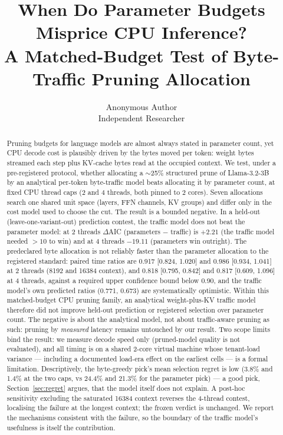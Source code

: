 \documentclass[11pt]{article}
\title{When Do Parameter Budgets Misprice CPU Inference?\\ A Matched-Budget Test of Byte-Traffic Pruning Allocation}
\author{Anonymous Author\\ Independent Researcher}
\date{}
\begin{document}
\maketitle

\begin{abstract}
Pruning budgets for language models are almost always stated in
parameter count, yet CPU decode cost is plausibly driven by the bytes
moved per token: weight bytes streamed each step plus KV-cache bytes
read at the occupied context. We test, under a pre-registered
protocol, whether allocating a $\sim$25\% structured prune of
Llama-3.2-3B by an analytical per-token byte-traffic model beats
allocating it by parameter count, at fixed CPU thread caps
(2 and 4 threads, both pinned to 2 cores). Seven
allocations search one shared unit space (layers, FFN channels, KV
groups) and differ only in the cost model used to choose the cut.
The result is a bounded negative. In a held-out
(leave-one-variant-out) prediction contest, the traffic model does
not beat the parameter model: at 2 threads $\Delta$AIC
(parameters $-$ traffic) is $+2.21$
(the traffic model needed $>10$ to win) and at 4 threads $-19.11$
(parameters win outright). The predeclared byte allocation is not
reliably faster than the parameter allocation to the registered
standard: paired time ratios are 0.917 [0.824, 1.020] and 0.986
[0.934, 1.041] at 2 threads (8192 and 16384 context), and 0.818
[0.795, 0.842] and 0.817 [0.609, 1.096] at 4 threads, against a
required upper confidence bound below 0.90, and the traffic model's
own predicted ratios (0.771, 0.673) are systematically optimistic.
Within this matched-budget CPU pruning family, an analytical
weight-plus-KV traffic model therefore did not improve held-out
prediction or registered selection over parameter count. The
negative is about the analytical model, not about traffic-aware
pruning as such: pruning by \emph{measured} latency remains
untouched by our result. Two
scope limits bind the result: we measure decode speed only
(pruned-model quality is not evaluated), and all timing is on a
shared 2-core virtual machine whose tenant-load variance ---
including a documented load-era effect on the earliest cells ---
is a formal limitation. Descriptively, the byte-greedy pick's
mean selection regret is low (3.8\% and 1.4\% at the two caps,
vs 24.4\% and 21.3\% for the parameter pick) --- a good pick,
Section~\ref{sec:regret} argues, that the model itself does not
explain. A post-hoc sensitivity excluding the saturated
16384 context reverses the 4-thread contest, localising the
failure at the longest context; the frozen verdict is unchanged.
We report the mechanisms consistent with the failure,
so the boundary of the traffic model's usefulness is itself
the contribution.
\end{abstract}
\end{document}
